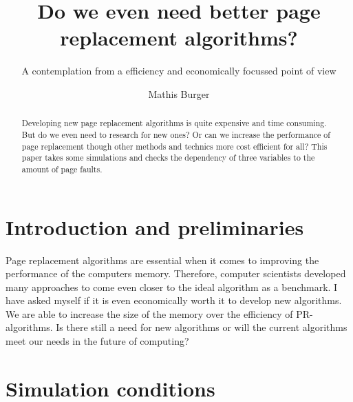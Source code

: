 \documentclass[12pt, reqno]{amsart}
\numberwithin{equation}{section}
\begin{document}
\setcounter{page}{1}



\centerline{}

\centerline{}

\title{Do we even need better page replacement algorithms?}
\subtitle{A contemplation from a efficiency and economically focussed point of view}

\author{Mathis Burger}

\begin{abstract}
Developing new page replacement algorithms is quite expensive and time consuming. But do we even need to research for new ones? Or can we
increase the performance of page replacement though other methods and technics more cost efficient for all? This paper takes some simulations
and checks the dependency of three variables to the amount of page faults.
\end{abstract} \maketitle

\section{Introduction and preliminaries}

\noindent Page replacement algorithms are essential when it comes to improving the performance of the computers memory. Therefore, computer scientists developed many
approaches to come even closer to the ideal algorithm as a benchmark. I have asked myself if it is even economically worth it to develop new algorithms. We are able to increase the
size of the memory over the efficiency of PR-algorithms. Is there still a need for new algorithms or will the current algorithms meet our needs in the future of computing?

\section{Simulation conditions}
\end{document}
